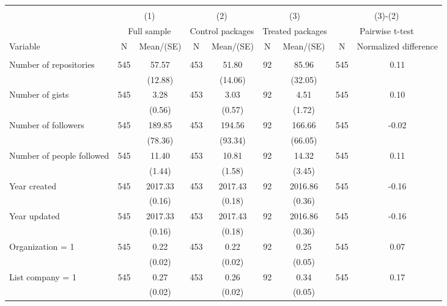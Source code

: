 \begin{tabular}{@{\extracolsep{5pt}}lcccccccc}
\\[-1.8ex]\hline \hline \\[-1.8ex]
 & \multicolumn{2}{c}{(1)}  & \multicolumn{2}{c}{(2)}  & \multicolumn{2}{c}{(3)}  & \multicolumn{2}{c}{(3)-(2)} \\
 & \multicolumn{2}{c}{Full sample}  & \multicolumn{2}{c}{Control packages}  & \multicolumn{2}{c}{Treated packages}  & \multicolumn{2}{c}{Pairwise t-test}  \\
Variable & N & Mean/(SE) & N & Mean/(SE) & N & Mean/(SE) & N & Normalized difference \\ \hline \\[-1.8ex] 
Number of repositories   & 545    & 57.57    & 453    & 51.80    & 92    & 85.96    & 545    & 0.11   \\
 &   & (12.88)  &   & (14.06)  &   & (32.05)  &   &  \\ [1ex]
Number of gists   & 545    & 3.28    & 453    & 3.03    & 92    & 4.51    & 545    & 0.10   \\
 &   & (0.56)  &   & (0.57)  &   & (1.72)  &   &  \\ [1ex]
Number of followers   & 545    & 189.85    & 453    & 194.56    & 92    & 166.66    & 545    & -0.02   \\
 &   & (78.36)  &   & (93.34)  &   & (66.05)  &   &  \\ [1ex]
Number of people followed   & 545    & 11.40    & 453    & 10.81    & 92    & 14.32    & 545    & 0.11   \\
 &   & (1.44)  &   & (1.58)  &   & (3.45)  &   &  \\ [1ex]
Year created   & 545    & 2017.33    & 453    & 2017.43    & 92    & 2016.86    & 545    & -0.16   \\
 &   & (0.16)  &   & (0.18)  &   & (0.36)  &   &  \\ [1ex]
Year updated   & 545    & 2017.33    & 453    & 2017.43    & 92    & 2016.86    & 545    & -0.16   \\
 &   & (0.16)  &   & (0.18)  &   & (0.36)  &   &  \\ [1ex]
Organization = 1   & 545    & 0.22    & 453    & 0.22    & 92    & 0.25    & 545    & 0.07   \\
 &   & (0.02)  &   & (0.02)  &   & (0.05)  &   &  \\ [1ex]
List company = 1   & 545    & 0.27    & 453    & 0.26    & 92    & 0.34    & 545    & 0.17   \\
 &   & (0.02)  &   & (0.02)  &   & (0.05)  &   &  \\ [1ex]

\end{tabular}
